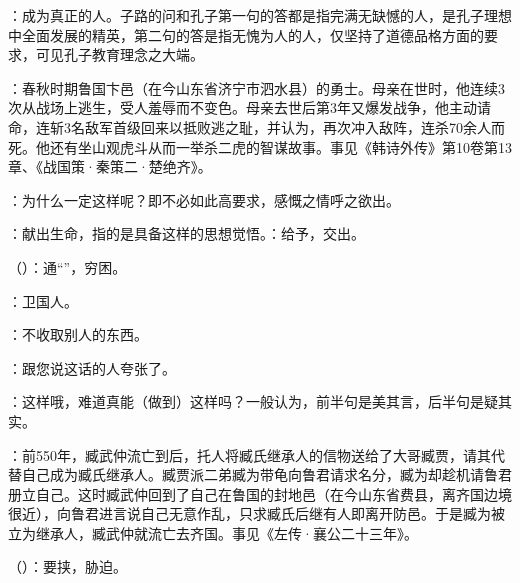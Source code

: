 {
\item {}：成为真正的人。子路的问和孔子第一句的答都是指完满无缺憾的人，是孔子理想中全面发展的精英，第二句的答是指无愧为人的人，仅坚持了道德品格方面的要求，可见孔子教育理念之大端。
\item {}：春秋时期鲁国卞邑（在今山东省济宁市泗水县）的勇士。母亲在世时，他连续3次从战场上逃生，受人羞辱而不变色。母亲去世后第3年又爆发战争，他主动请命，连斩3名敌军首级回来以抵败逃之耻，并认为，再次冲入敌阵，连杀70余人而死。他还有坐山观虎斗从而一举杀二虎的智谋故事。事见《韩诗外传》第10卷第13章、《战国策·秦策二·楚绝齐》。
\item {}：为什么一定这样呢？即不必如此高要求，感慨之情呼之欲出。
\item {}：献出生命，指的是具备这样的思想觉悟。：给予，交出。
\item {}（）：通“”，穷困。
}
{}


{
\item {}：卫国人。
\item {}：不收取别人的东西。
\item {}：跟您说这话的人夸张了。
\item {}：这样哦，难道真能（做到）这样吗？一般认为，前半句是美其言，后半句是疑其实。
}
{}


{
\item {}：前550年，臧武仲流亡到后，托人将臧氏继承人的信物送给了大哥臧贾，请其代替自己成为臧氏继承人。臧贾派二弟臧为带龟向鲁君请求名分，臧为却趁机请鲁君册立自己。这时臧武仲回到了自己在鲁国的封地邑（在今山东省费县，离齐国边境很近），向鲁君进言说自己无意作乱，只求臧氏后继有人即离开防邑。于是臧为被立为继承人，臧武仲就流亡去齐国。事见《左传·襄公二十三年》。
\item {}（）：要挟，胁迫。
}
{}


